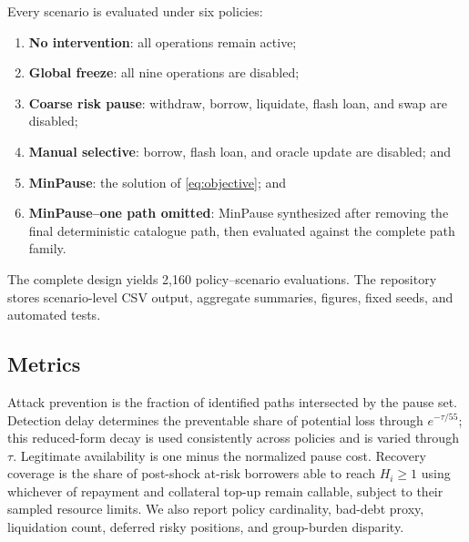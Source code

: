 \documentclass[sn-vancouver,Numbered]{sn-jnl}
\newcommand{\ExperimentRuns}{2,160}
\begin{document}
Every scenario is evaluated under six policies:
\begin{enumerate}
  \item \textbf{No intervention}: all operations remain active;
  \item \textbf{Global freeze}: all nine operations are disabled;
  \item \textbf{Coarse risk pause}: withdraw, borrow, liquidate, flash loan, and swap are disabled;
  \item \textbf{Manual selective}: borrow, flash loan, and oracle update are disabled; and
  \item \textbf{MinPause}: the solution of \eqref{eq:objective}; and
  \item \textbf{MinPause--one path omitted}: MinPause synthesized after removing the final deterministic catalogue path, then evaluated against the complete path family.
\end{enumerate}
The complete design yields \ExperimentRuns{} policy--scenario evaluations.  The repository stores scenario-level CSV output, aggregate summaries, figures, fixed seeds, and automated tests.

\subsection{Metrics}
Attack prevention is the fraction of identified paths intersected by the pause set.  Detection delay determines the preventable share of potential loss through $e^{-\tau/55}$; this reduced-form decay is used consistently across policies and is varied through $\tau$.  Legitimate availability is one minus the normalized pause cost.  Recovery coverage is the share of post-shock at-risk borrowers able to reach $H_i\geq1$ using whichever of repayment and collateral top-up remain callable, subject to their sampled resource limits.  We also report policy cardinality, bad-debt proxy, liquidation count, deferred risky positions, and group-burden disparity.
\end{document}
